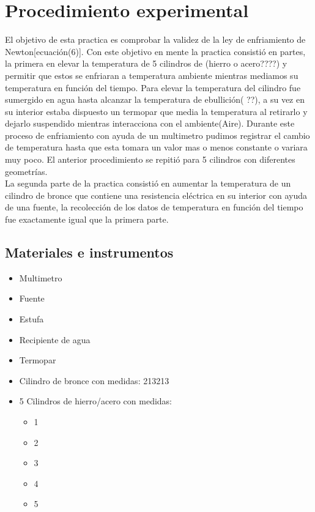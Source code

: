\documentclass[10pt]{article}
\begin{document}
\section{Procedimiento experimental}
El objetivo de esta practica es comprobar la validez de la ley de enfriamiento de Newton[ecuación(6)]. Con este objetivo en mente la practica consistió en partes, la primera en elevar la temperatura de 5 cilindros de (hierro o acero????)  y permitir que estos se enfriaran a temperatura ambiente mientras mediamos su temperatura en función del tiempo. 
Para elevar la temperatura del cilindro fue sumergido en agua hasta alcanzar la temperatura de ebullición( ??), a su vez en su interior estaba dispuesto un termopar que media la temperatura al retirarlo y dejarlo suspendido mientras interacciona con el ambiente(Aire). Durante este proceso de enfriamiento con ayuda de un multimetro pudimos registrar el cambio de temperatura hasta que esta tomara un valor mas o menos constante o variara muy poco. El anterior procedimiento se repitió para 5 cilindros con diferentes geometrías.  \\ 
La segunda parte de la practica consistió en aumentar la temperatura de un cilindro de bronce que contiene una resistencia eléctrica en su interior con ayuda de una fuente, la recolección de los datos de temperatura en función del tiempo fue exactamente igual que la primera parte.

\subsection{Materiales e instrumentos}
\begin{itemize}
    \item Multimetro
    \item Fuente 
    \item Estufa
    \item Recipiente de agua
    \item Termopar
    \item Cilindro de bronce con medidas:
        213213
    \item 5 Cilindros de hierro/acero con medidas: 
        \begin{itemize}
        \item 1
        \item 2
        \item 3
        \item 4
        \item 5
        \end{itemize}
\end{itemize}
\end{document}
